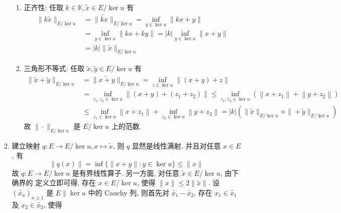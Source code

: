 \begin{enumerate}
\begin{enumerate}
\begin{enumerate}
                    \item 正齐性: 任取 $k \in \mathbb{K}, \widetilde{x} \in E / \operatorname{ker} u$ 有
                    \[
                    \begin{aligned}
                    \|k \widetilde{x}\|_{E / \operatorname{ker} u} &=\|\widetilde{k x}\|_{E / \operatorname{ker} u}=\inf _{y \in \operatorname{ker} u}\|k x+y\| \\
                    &=\inf _{y \in \operatorname{ker} u}\|k x+k y\|=|k| \inf _{y \in \operatorname{ker} u}\|x+y\| \\
                    &=|k|\|\widetilde{x}\|_{E / \operatorname{ker} u}
                    \end{aligned}
                    \]
                    \item 三角形不等式: 任取 $\widetilde{x}, \widetilde{y} \in E / \operatorname{ker} u$ 有
                    \[
                    \begin{aligned}
                    \|\widetilde{x}+\widetilde{y}\|_{E / \operatorname{ker} u} &=\|\widetilde{x+y}\|_{E / \operatorname{ker} u}=\inf _{z \in \operatorname{ker} u}\|(x+y)+z\| \\
                    &=\inf _{z_{1}, z_{2} \in \operatorname{ker} u}\left\|(x+y)+\left(z_{1}+z_{2}\right)\right\| \leq \inf _{z_{1}, z_{2} \in \operatorname{ker} u}\left(\left\|x+z_{1}\right\|+\left\|y+z_{2}\right\|\right) \\
                    & \leq \inf _{z_{1} \in \operatorname{ker} u}\left\|x+z_{1}\right\|+\inf _{z_{2} \in \operatorname{ker} u}\left\|y+z_{2}\right\|=|k|\left(\|\widetilde{x}\|_{E / \operatorname{ker} u}+\|+\widetilde{y}\|_{E / \operatorname{ker} u}\right)
                    \end{aligned}
                    \]
                    故 $\|\cdot\|_{E / \operatorname{ker} u}$ 是 $E / \operatorname{ker} u$ 上的范数.
                \end{enumerate}
            \item 建立映射 $q: E \rightarrow E / \operatorname{ker} u, x \mapsto \widetilde{x}$, 则 $q$ 显然是线性满射. 并且对任意 $x \in E$, 有
            \[
            \|q(x)\|=\inf \{\|x+y\|: y \in \operatorname{ker} u\} \leq\|x\|
            \]
            故 $q: E \rightarrow E / \operatorname{ker} u$ 是有界线性算子. 另一方面, 对任意 $\widetilde{x} \in E / \operatorname{ker} u$, 由下确界的 定义立即可得, 存在 $x \in E / \operatorname{ker} u$, 使得 $\|x\| \leq 2\|\widetilde{x}\|$. 设 $\left(\widetilde{x_{n}}\right)_{n \geq 1}$ 是 $E \| \operatorname{ker} u$ 中的 Cauchy 列, 则首先对 $\widetilde{x_{1}}-\widetilde{x_{2}}$, 存在 $x_{1} \in \widetilde{x_{1}}$ 及 $x_{2} \in \widetilde{x_{2}}$, 使得

\end{enumerate}
\end{enumerate}
